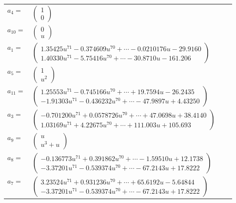 \documentclass[1p]{elsarticle_modified}
\theoremstyle{definition}
\begin{document}
\begin{tabular}{m{7pt} m{180pt} m{7pt} m{180pt} }
\flushright $a_{4}=$&$\begin{pmatrix}1\\0\end{pmatrix}$ \\
\flushright $a_{10}=$&$\begin{pmatrix}0\\u\end{pmatrix}$ \\
\flushright $a_{1}=$&$\begin{pmatrix}1.35425 u^{71}-0.374609 u^{70}+\cdots-0.0210176 u-29.9160\\1.40330 u^{71}-5.75416 u^{70}+\cdots-30.8710 u-161.206\end{pmatrix}$ \\
\flushright $a_{5}=$&$\begin{pmatrix}1\\u^2\end{pmatrix}$ \\
\flushright $a_{11}=$&$\begin{pmatrix}1.25553 u^{71}-0.745166 u^{70}+\cdots+19.7594 u-26.2435\\-1.91303 u^{71}-0.436232 u^{70}+\cdots-47.9897 u+4.43250\end{pmatrix}$ \\
\flushright $a_{3}=$&$\begin{pmatrix}-0.701200 u^{71}+0.0578726 u^{70}+\cdots+47.0698 u+38.4140\\1.03169 u^{71}+4.22675 u^{70}+\cdots+111.003 u+105.693\end{pmatrix}$ \\
\flushright $a_{9}=$&$\begin{pmatrix}u\\u^3+u\end{pmatrix}$ \\
\flushright $a_{8}=$&$\begin{pmatrix}-0.136773 u^{71}+0.391862 u^{70}+\cdots-1.59510 u+12.1738\\-3.37201 u^{71}-0.539374 u^{70}+\cdots-67.2143 u+17.8222\end{pmatrix}$ \\
\flushright $a_{7}=$&$\begin{pmatrix}3.23524 u^{71}+0.931236 u^{70}+\cdots+65.6192 u-5.64844\\-3.37201 u^{71}-0.539374 u^{70}+\cdots-67.2143 u+17.8222\end{pmatrix}$ \\

\end{tabular}
\end{document}
